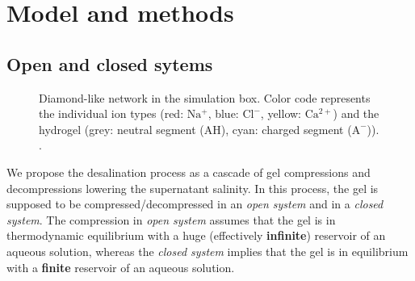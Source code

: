 \documentclass[journal,article,submit,pdftex,moreauthors]{Definitions/mdpi}
\newcommand{\A}{\mathrm{A^-}}
\newcommand{\AH}{\mathrm{AH}}
\newcommand{\cl}{\mathrm{Cl^-}}
\newcommand{\na}{\mathrm{Na^+}}
\newcommand{\ca}{\mathrm{Ca^{2+}}}
\begin{document}
\section{Model and methods\label{sec: theory}}



\subsection{Open and closed sytems}
\begin{figure}[h]
	\centering
	\caption{Diamond-like network in the simulation box. Color code represents
		the individual ion types (red: $\na$, blue: $\cl$, yellow: $\ca$)
		and the hydrogel (grey: neutral segment ($\AH$), cyan: charged segment
		($\A$)). \label{fig:open and closed}.}
\end{figure}

We propose the desalination process as a cascade of gel compressions and decompressions lowering the  supernatant salinity.
In this process, the gel is supposed to be compressed/decompressed in an \emph{open system} and in a \emph{closed system}.
The compression in \emph{open system} assumes that the gel is in thermodynamic equilibrium with a huge (effectively \textbf{infinite}) reservoir of an aqueous solution, whereas 
the \emph{closed system} implies that the gel is in equilibrium with a \textbf{finite} reservoir of an aqueous solution. 
\end{document}
